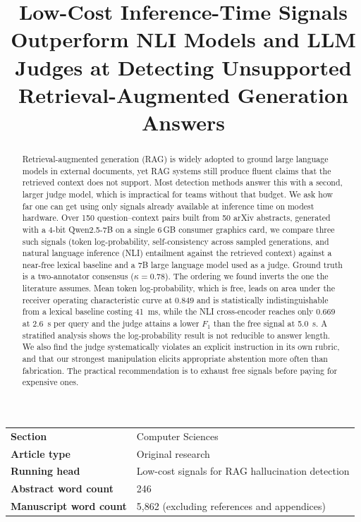 \documentclass[11pt,a4paper]{article}
\title{\textbf{Low-Cost Inference-Time Signals Outperform NLI Models and LLM
Judges at Detecting Unsupported Retrieval-Augmented Generation Answers}}
\date{}
\author{}
\begin{document}
\maketitle
\thispagestyle{empty}

\begin{center}
\begin{tabular}{@{}ll@{}}
\textbf{Section} & Computer Sciences \\
\textbf{Article type} & Original research \\
\textbf{Running head} & Low-cost signals for RAG hallucination detection \\
\textbf{Abstract word count} & 246 \\
\textbf{Manuscript word count} & 5,862 (excluding references and appendices) \\
\end{tabular}
\end{center}

\vspace{1em}

\begin{abstract}
\noindent
Retrieval-augmented generation (RAG) is widely adopted to ground large language
models in external documents, yet RAG systems still produce fluent claims that
the retrieved context does not support. Most detection methods answer this with
a second, larger judge model, which is impractical for teams without that
budget. We ask how far one can get using only signals already available at
inference time on modest hardware. Over 150 question--context pairs built from
50 arXiv abstracts, generated with a 4-bit Qwen2.5-7B on a single 6\,GB consumer
graphics card, we compare three such signals (token log-probability, self-consistency
across sampled generations, and natural language inference (NLI) entailment
against the retrieved context) against a near-free lexical baseline and a 7B
large language model used as a judge. Ground truth is a two-annotator consensus
($\kappa = 0.78$). The ordering we found inverts the one the literature assumes.
Mean token log-probability, which is free, leads on area under the receiver
operating characteristic curve at $0.849$ and is statistically indistinguishable
from a lexical baseline costing \SI{41}{\milli\second}, while the NLI
cross-encoder reaches only $0.669$ at \SI{2.6}{\second} per query and the judge
attains a lower $F_1$ than the free signal at \SI{5.0}{\second}. A stratified
analysis shows the log-probability result is not reducible to answer length. We
also find the judge systematically violates an explicit instruction in its own
rubric, and that our strongest manipulation elicits appropriate abstention more
often than fabrication. The practical recommendation is to exhaust free signals
before paying for expensive ones.
\end{abstract}
\end{document}
